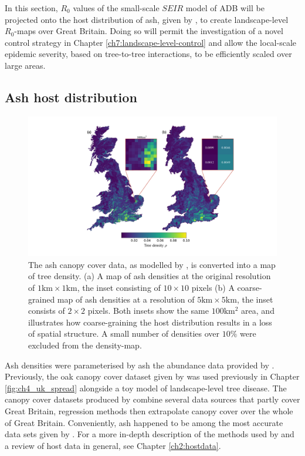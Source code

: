 \label{sec:r0-map-construct}
In this section, $R_0$ values of the small-scale $SEIR$ model of ADB will be projected onto the host distribution of ash, 
given by \cite{hill.data}, to create landscape-level $R_0$-maps over Great Britain. 
Doing so will permit the investigation of a novel control strategy in Chapter \ref{ch7:landscape-level-control} 
and allow the local-scale epidemic severity, based on tree-to-tree interactions, to be efficiently scaled over large areas.

\subsection{Ash host distribution}

\begin{figure}
    \centering
    \includegraphics[scale=0.45]{chapter6/figures/fig-ash-data.pdf}
    \caption{The ash canopy cover data, as modelled by \cite{hill.data}, is converted into a map of tree density. (a) A map of ash densities at the original resolution of $1\mathrm{km} \times 1\mathrm{km}$, the inset consisting of $10\times 10$ pixels (b) A coarse-grained map of ash densities at a resolution of $5\mathrm{km} \times 5\mathrm{km}$, the inset consists of $2 \times 2$ pixels. Both insets show the same $100\mathrm{km^2}$ area, and illustrates how coarse-graining the host distribution results in a loss of spatial structure. A small number of densities over $10\%$ were excluded from the density-map.}
    \label{fig:ash-host-data}
\end{figure}

Ash densities were parameterised by ash the abundance data provided by \cite{hill.data}. 
Previously, the oak canopy cover dataset given by \cite{hill.data} was used previously in Chapter \ref{fig:ch4_uk_spread} 
alongside a toy model of landscape-level tree disease. The canopy cover datasets produced by \cite{hill.data} combine
several data sources that partly cover Great Britain, regression methods then extrapolate canopy cover over the whole of Great Britain.
Conveniently, ash happened to be among the most accurate data sets given by \cite{hill.data}. 
For a more in-depth description of the methods used by \cite{hill.data} and a review of host data in general, see Chapter \ref{ch2:hostdata}.

